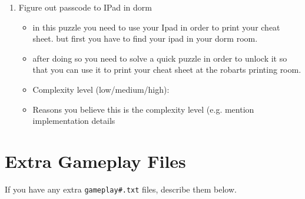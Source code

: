 \documentclass[11pt]{article}
\begin{document}
\begin{enumerate}
\item Figure out passcode to IPad in dorm
	\begin{itemize}
	\item in this puzzle you need to use your Ipad in order to print your cheat sheet. but first you have to find your ipad in your dorm room.
	\item after doing so you need to solve a quick puzzle in order to unlock it so that you can use it to print your cheat sheet at the robarts printing room.
	\item Complexity level (low/medium/high):
	\item Reasons you believe this is the complexity level (e.g. mention implementation details
	\end{itemize}
\end{enumerate}


\section*{Extra Gameplay Files}

If you have any extra \texttt{gameplay\#.txt} files, describe them below.
\end{document}
